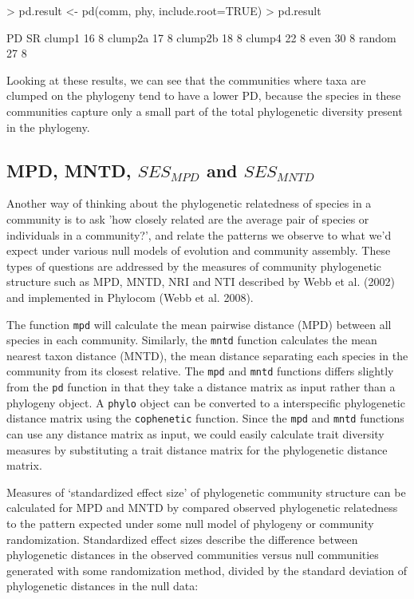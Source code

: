 \documentclass[12pt]{article}
\begin{document}
\begin{Schunk}
\begin{Sinput}
> pd.result <- pd(comm, phy, include.root=TRUE)
> pd.result
\end{Sinput}
\begin{Soutput}
        PD SR
clump1  16  8
clump2a 17  8
clump2b 18  8
clump4  22  8
even    30  8
random  27  8
\end{Soutput}
\end{Schunk}

Looking at these results, we can see that the communities where taxa are clumped on the phylogeny tend to have a lower PD, because the species in these communities capture only a small part of the total phylogenetic diversity present in the phylogeny.

\subsection{MPD, MNTD,  $SES_{MPD}$ and $SES_{MNTD}$}

Another way of thinking about the phylogenetic relatedness of species in a community is to ask 'how closely related are the average pair of species or individuals in a community?', and relate the patterns we observe to what we'd expect under various null models of evolution and community assembly. These types of questions are addressed by the measures of community phylogenetic structure such as MPD, MNTD, NRI and NTI described by Webb et al. (2002) and implemented in Phylocom (Webb et al. 2008).

The function \texttt{mpd} will calculate the mean pairwise distance (MPD) between all species in each community. Similarly, the \texttt{mntd} function calculates the mean nearest taxon distance (MNTD), the mean distance separating each species in the community from its closest relative. The \texttt{mpd} and \texttt{mntd} functions differs slightly from the \texttt{pd} function in that they take a distance matrix as input rather than a phylogeny object. A \texttt{phylo} object can be converted to a interspecific phylogenetic distance matrix using the \texttt{cophenetic} function. Since the \texttt{mpd} and \texttt{mntd} functions can use any distance matrix as input, we could easily calculate trait diversity measures by substituting a trait distance matrix for the phylogenetic distance matrix.

Measures of `standardized effect size' of phylogenetic community structure can be calculated for MPD and MNTD by compared observed phylogenetic relatedness to the pattern expected under some null model of phylogeny or community randomization. Standardized effect sizes describe the difference between phylogenetic distances in the observed communities versus null communities generated with some randomization method, divided by the standard deviation of phylogenetic distances in the null data:
\end{document}
